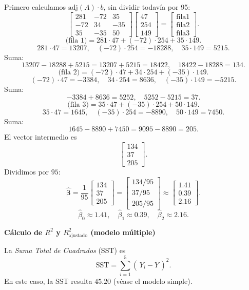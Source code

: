 \documentclass[10pt,a4paper]{article}
\begin{document}
\begin{enumerate}
Primero calculamos 
\(\mathrm{adj}(A)\cdot b\),
sin dividir todavía por 95:
\[
\begin{bmatrix}
281 & -72 & 35\\
-72 & 34 & -35\\
35 & -35 & 50
\end{bmatrix}
\begin{bmatrix}
47\\
254\\
149
\end{bmatrix}
=
\begin{bmatrix}
\text{fila1}\\
\text{fila2}\\
\text{fila3}
\end{bmatrix}.
\]
\[
\text{(fila 1)} 
= 281\cdot47 + (-72)\cdot254 + 35\cdot149.
\]
\[
281\cdot47=13207,\quad
(-72)\cdot254=-18288,\quad
35\cdot149=5215.
\]
Suma:
\[
13207 -18288 +5215= 13207 +5215=18422,\quad 18422-18288=134.
\]
\[
\text{(fila 2)}
= (-72)\cdot47 +34\cdot254 +(-35)\cdot149.
\]
\[
(-72)\cdot47=-3384,\quad
34\cdot254=8636,\quad
(-35)\cdot149=-5215.
\]
Suma:
\[
-3384+8636=5252,\quad 5252-5215=37.
\]
\[
\text{(fila 3)}
= 35\cdot47 +(-35)\cdot254 +50\cdot149.
\]
\[
35\cdot47=1645,\quad
(-35)\cdot254=-8890,\quad
50\cdot149=7450.
\]
Suma:
\[
1645-8890 +7450=9095-8890=205.
\]
El vector intermedio es
\[
\begin{bmatrix}
134\\
37\\
205
\end{bmatrix}.
\]
Dividimos por $95$:
\[
\hat{\boldsymbol{\beta}}
=
\frac{1}{95}
\begin{bmatrix}
134\\
37\\
205
\end{bmatrix}
=
\begin{bmatrix}
134/95\\
37/95\\
205/95
\end{bmatrix}
\approx
\begin{bmatrix}
1.41\\
0.39\\
2.16
\end{bmatrix}.
\]
\[
\boxed{
\hat{\beta}_0 \approx 1.41,
\quad
\hat{\beta}_1 \approx 0.39,
\quad
\hat{\beta}_2 \approx 2.16.
}
\]


\textbf{Cálculo de $R^2$ y $R_{\text{ajustado}}^2$ (modelo múltiple)}


La \emph{Suma Total de Cuadrados} (SST) es
\[
\text{SST}
= \sum_{i=1}^5 (\,Y_i - \bar{Y}\,)^2.
\]
En este caso, la SST resulta $45.20$ (véase el modelo simple).  


\end{enumerate}
\end{document}
